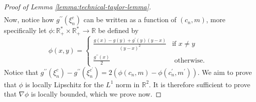 \documentclass[11pt]{article}
\numberwithin{equation}{section}
\theoremstyle{definition}
\theoremstyle{remark}
\def\R{{\mathbb R}}
\begin{document}
\begin{proof}[Proof of Lemma \ref{lemma:technical-taylor-lemma}]
\begin{equation}
\begin{aligned}
        \end{aligned}
    \end{equation}
    Now, notice how $g^{\prime \prime}(\xi^c_n)$ can be written as a function of $(c_n, m)$, more specifically let $\phi: \R_+^* \times \R_+^* \rightarrow \R$ be defined by
    \begin{equation*}
        \label{eq:definition-phi}
        \phi (x,y) = \begin{cases}
            \frac{g(x) - g (y) + g^\prime (y)(y - x)}{(y-x)^2} & \text{if } x \neq y \\
            \frac{g^{\prime \prime}(x)}{2}                      & \text{ otherwise}.
        \end{cases}
    \end{equation*}
    Notice that $g^{\prime \prime}(\xi_n^c) - g^{\prime \prime}(\xi_n^{c^\prime}) = 2 (\phi (c_n, m) - \phi (c_n^\prime, m^\prime))$. We aim to prove that $\phi$ is locally Lipschitz for the $L^1$ norm in $\mathbb R^2$. It is therefore sufficient to prove that $\nabla \phi$ is locally bounded, which we prove now.


\end{proof}
\end{document}

